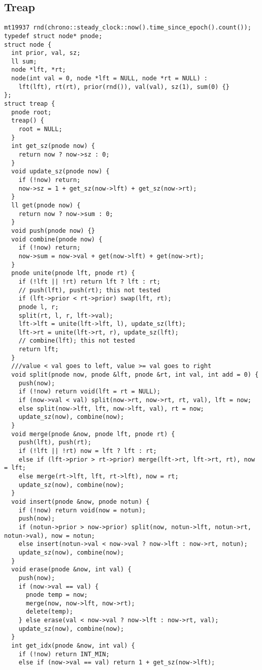 \documentclass[FSZ,a4paper,onesided]{article}
\begin{document}
\begin{multicols*}{\COLS}
\subsection{Treap}
\begin{lstlisting}
mt19937 rnd(chrono::steady_clock::now().time_since_epoch().count());
typedef struct node* pnode;
struct node {
  int prior, val, sz;
  ll sum;
  node *lft, *rt;
  node(int val = 0, node *lft = NULL, node *rt = NULL) : 
    lft(lft), rt(rt), prior(rnd()), val(val), sz(1), sum(0) {}
};
struct treap {
  pnode root;
  treap() {
    root = NULL;
  }
  int get_sz(pnode now) {
    return now ? now->sz : 0;
  }
  void update_sz(pnode now) {
    if (!now) return;
    now->sz = 1 + get_sz(now->lft) + get_sz(now->rt);
  }
  ll get(pnode now) {
    return now ? now->sum : 0;
  }
  void push(pnode now) {}
  void combine(pnode now) {
    if (!now) return;
    now->sum = now->val + get(now->lft) + get(now->rt);
  }
  pnode unite(pnode lft, pnode rt) {
    if (!lft || !rt) return lft ? lft : rt;
    // push(lft), push(rt); this not tested
    if (lft->prior < rt->prior) swap(lft, rt);
    pnode l, r;
    split(rt, l, r, lft->val);
    lft->lft = unite(lft->lft, l), update_sz(lft);
    lft->rt = unite(lft->rt, r), update_sz(lft);
    // combine(lft); this not tested
    return lft;
  }
  ///value < val goes to left, value >= val goes to right
  void split(pnode now, pnode &lft, pnode &rt, int val, int add = 0) {
    push(now);
    if (!now) return void(lft = rt = NULL);
    if (now->val < val) split(now->rt, now->rt, rt, val), lft = now;
    else split(now->lft, lft, now->lft, val), rt = now;
    update_sz(now), combine(now);
  }
  void merge(pnode &now, pnode lft, pnode rt) {
    push(lft), push(rt);
    if (!lft || !rt) now = lft ? lft : rt;
    else if (lft->prior > rt->prior) merge(lft->rt, lft->rt, rt), now = lft;
    else merge(rt->lft, lft, rt->lft), now = rt;
    update_sz(now), combine(now);
  }
  void insert(pnode &now, pnode notun) {
    if (!now) return void(now = notun);
    push(now);
    if (notun->prior > now->prior) split(now, notun->lft, notun->rt, notun->val), now = notun;
    else insert(notun->val < now->val ? now->lft : now->rt, notun);
    update_sz(now), combine(now);
  }
  void erase(pnode &now, int val) {
    push(now);
    if (now->val == val) {
      pnode temp = now;
      merge(now, now->lft, now->rt);
      delete(temp);
    } else erase(val < now->val ? now->lft : now->rt, val);
    update_sz(now), combine(now);
  }
  int get_idx(pnode &now, int val) {
    if (!now) return INT_MIN;
    else if (now->val == val) return 1 + get_sz(now->lft);

\end{lstlisting}
\end{multicols*}
\end{document}
